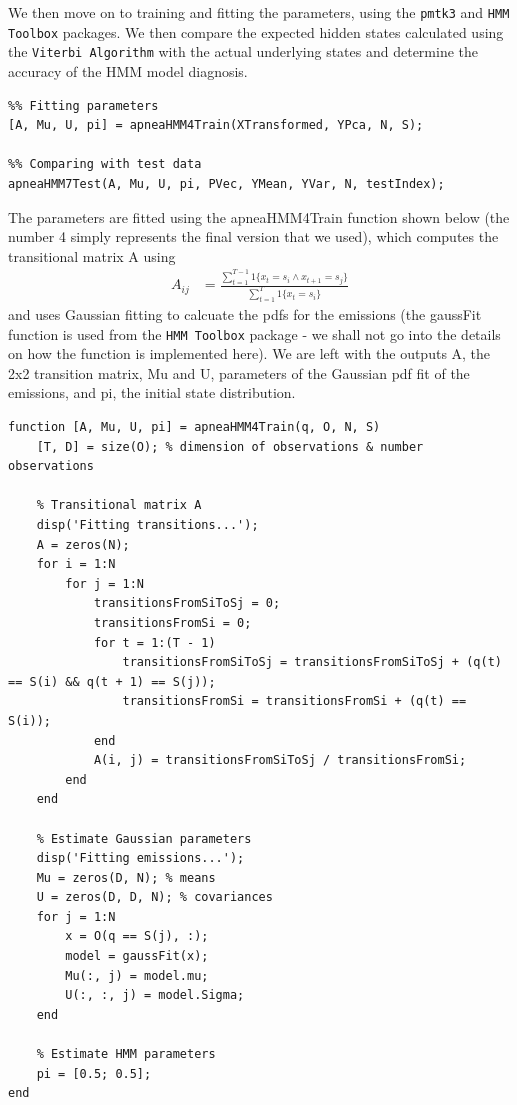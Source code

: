 We then move on to training and fitting the parameters, using the \verb!pmtk3! and \verb!HMM Toolbox! packages. We then compare the expected hidden states calculated using the \verb!Viterbi Algorithm! with the actual underlying states and determine the accuracy of the HMM model diagnosis.
\begin{lstlisting}
%% Fitting parameters
[A, Mu, U, pi] = apneaHMM4Train(XTransformed, YPca, N, S);

%% Comparing with test data
apneaHMM7Test(A, Mu, U, pi, PVec, YMean, YVar, N, testIndex);
\end{lstlisting}

The parameters are fitted using the apneaHMM4Train function shown below (the number 4 simply represents the final version that we used), which computes the transitional matrix A using
\begin{align}
		A_{ij} & = \frac{\sum_{t = 1}^{T - 1} 1\{x_t = s_i \land x_{t + 1} = s_j\}}{\sum_{t = 1}^{T} 1\{x_t = s_i\}}
\end{align}
and uses Gaussian fitting to calcuate the pdfs for the emissions (the gaussFit function is used from the \verb!HMM Toolbox! package - we shall not go into the details on how the function is implemented here). We are left with the outputs A, the 2x2 transition matrix, Mu and U, parameters of the Gaussian pdf fit of the emissions, and pi, the initial state distribution.
 
\begin{lstlisting}
function [A, Mu, U, pi] = apneaHMM4Train(q, O, N, S)
    [T, D] = size(O); % dimension of observations & number observations

    % Transitional matrix A
    disp('Fitting transitions...');
    A = zeros(N);
    for i = 1:N
        for j = 1:N
            transitionsFromSiToSj = 0;
            transitionsFromSi = 0;
            for t = 1:(T - 1)
                transitionsFromSiToSj = transitionsFromSiToSj + (q(t) == S(i) && q(t + 1) == S(j));
                transitionsFromSi = transitionsFromSi + (q(t) == S(i));
            end
            A(i, j) = transitionsFromSiToSj / transitionsFromSi;
        end
    end

    % Estimate Gaussian parameters
    disp('Fitting emissions...');
    Mu = zeros(D, N); % means
    U = zeros(D, D, N); % covariances
    for j = 1:N
        x = O(q == S(j), :);
        model = gaussFit(x);
        Mu(:, j) = model.mu;
        U(:, :, j) = model.Sigma;
    end

    % Estimate HMM parameters
    pi = [0.5; 0.5];
end
\end{lstlisting}

